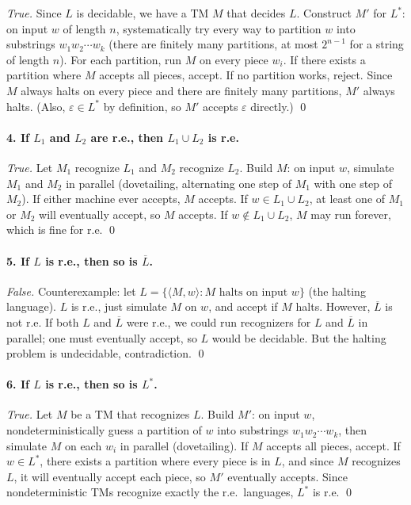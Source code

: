 \documentclass{article}
\theoremstyle{theorem}
\theoremstyle{definition}
\theoremstyle{remark}
\begin{document}
\emph{True.} Since $L$ is decidable, we have a TM $M$ that decides $L$. Construct $M'$ for $L^*$: on input $w$ of length $n$, systematically try every way to partition $w$ into substrings $w_1 w_2 \cdots w_k$ (there are finitely many partitions, at most $2^{n-1}$ for a string of length $n$). For each partition, run $M$ on every piece $w_i$. If there exists a partition where $M$ accepts all pieces, accept. If no partition works, reject. Since $M$ always halts on every piece and there are finitely many partitions, $M'$ always halts. (Also, $\varepsilon \in L^*$ by definition, so $M'$ accepts $\varepsilon$ directly.) \qed

\paragraph{4. If $L_1$ and $L_2$ are r.e., then $L_1 \cup L_2$ is r.e.}

\emph{True.} Let $M_1$ recognize $L_1$ and $M_2$ recognize $L_2$. Build $M$: on input $w$, simulate $M_1$ and $M_2$ in parallel (dovetailing, alternating one step of $M_1$ with one step of $M_2$). If either machine ever accepts, $M$ accepts. If $w \in L_1 \cup L_2$, at least one of $M_1$ or $M_2$ will eventually accept, so $M$ accepts. If $w \notin L_1 \cup L_2$, $M$ may run forever, which is fine for r.e. \qed

\paragraph{5. If $L$ is r.e., then so is $\overline{L}$.}

\emph{False.} Counterexample: let $L = \{\langle M, w \rangle : M \text{ halts on input } w\}$ (the halting language). $L$ is r.e., just simulate $M$ on $w$, and accept if $M$ halts. However, $\overline{L}$ is not r.e. If both $L$ and $\overline{L}$ were r.e., we could run recognizers for $L$ and $\overline{L}$ in parallel; one must eventually accept, so $L$ would be decidable. But the halting problem is undecidable, contradiction. \qed

\paragraph{6. If $L$ is r.e., then so is $L^*$.}

\emph{True.} Let $M$ be a TM that recognizes $L$. Build $M'$: on input $w$, nondeterministically guess a partition of $w$ into substrings $w_1 w_2 \cdots w_k$, then simulate $M$ on each $w_i$ in parallel (dovetailing). If $M$ accepts all pieces, accept. If $w \in L^*$, there exists a partition where every piece is in $L$, and since $M$ recognizes $L$, it will eventually accept each piece, so $M'$ eventually accepts. Since nondeterministic TMs recognize exactly the r.e.\ languages, $L^*$ is r.e. \qed
\end{document}
